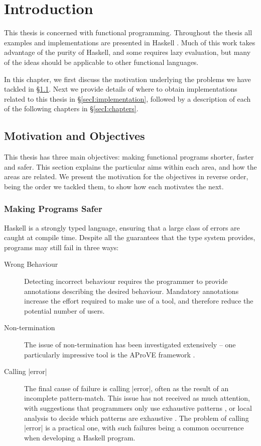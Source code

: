 
\chapter{Introduction}
\label{chp:introduction}

This thesis is concerned with functional programming. Throughout the thesis all examples and implementations are presented in Haskell \cite{haskell}. Much of this work takes advantage of the purity of Haskell, and some requires lazy evaluation, but many of the ideas should be applicable to other functional languages.

In this chapter, we first discuss the motivation underlying the problems we have tackled in \S\ref{secI:motivation}. Next we provide details of where to obtain implementations related to this thesis in \S\ref{secI:implementation}, followed by a description of each of the following chapters in \S\ref{secI:chapters}.


\section{Motivation and Objectives}
\label{secI:motivation}

This thesis has three main objectives: making functional programs shorter, faster and safer. This section explains the particular aims within each area, and how the areas are related. We present the motivation for the objectives in reverse order, being the order we tackled them, to show how each motivates the next.

\subsection{Making Programs Safer}

Haskell is a strongly typed language, ensuring that a large class of errors are caught at compile time. Despite all the guarantees that the type system provides, programs may still fail in three ways:

\begin{description}
\item[Wrong Behaviour] Detecting incorrect behaviour requires the programmer to provide annotations describing the desired behaviour. Mandatory annotations increase the effort required to make use of a tool, and therefore reduce the potential number of users.
\item[Non-termination] The issue of non-termination has been investigated extensively -- one particularly impressive tool is the AProVE framework \cite{aprove_haskell}.
\item[Calling |error|] The final cause of failure is calling |error|, often as the result of an incomplete pattern-match. This issue has not received as much attention, with suggestions that programmers only use exhaustive patterns \cite{turner:total}, or local analysis to decide which patterns are exhaustive \cite{maranget:pattern_warnings}. The problem of calling |error| is a practical one, with such failures being a common occurrence when developing a Haskell program.
\end{description}

